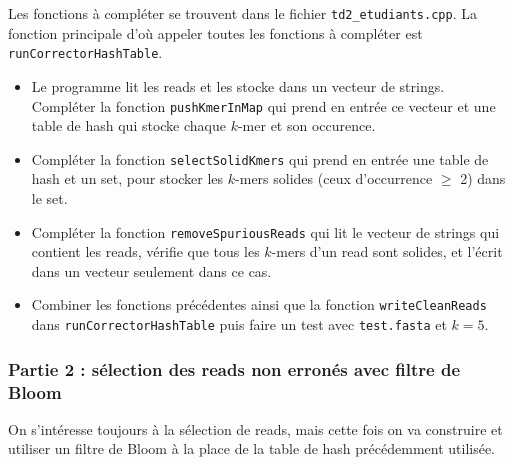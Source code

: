\documentclass{article}
\begin{document}
Les fonctions à compléter se trouvent dans le fichier \texttt{td2\_etudiants.cpp}. La fonction principale d'où appeler toutes les fonctions à compléter est \texttt{runCorrectorHashTable}.
\begin{itemize} 
 \item Le programme lit les reads et les stocke dans un vecteur de strings. Compléter la fonction \texttt{pushKmerInMap} qui prend en entrée ce vecteur et une table de hash qui stocke chaque $k$-mer et son occurence.
 \item Compléter la fonction \texttt{selectSolidKmers} qui prend en entrée une table de hash et un set, pour stocker les $k$-mers solides (ceux d'occurrence $\geq$ 2) dans le set.
 \item Compléter la fonction \texttt{removeSpuriousReads} qui lit le vecteur de strings qui contient les reads, vérifie que tous les $k$-mers d'un read sont solides, et l'écrit dans un vecteur seulement dans ce cas.
 \item Combiner les fonctions précédentes ainsi que la fonction \texttt{writeCleanReads} dans \texttt{runCorrectorHashTable} puis faire un test avec  \texttt{test.fasta} et $k=5$.
\end{itemize}

\noindent{}

\subsubsection*{Partie 2 : sélection des reads non erronés avec filtre de Bloom}
On s'intéresse toujours à la sélection de reads, mais cette fois on va construire et utiliser un filtre de Bloom à la place de la table de hash précédemment utilisée.\\

\noindent{}\\
\end{document}
